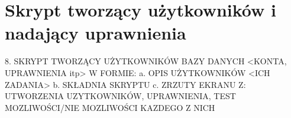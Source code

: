 \section{Skrypt tworzący użytkowników i nadający uprawnienia}


8. SKRYPT TWORZĄCY UŻYTKOWNIKÓW BAZY DANYCH <KONTA, UPRAWNIENIA itp>
W FORMIE:
a. OPIS UŻYTKOWNIKÓW <ICH ZADANIA>
b. SKŁADNIA SKRYPTU
c. ZRZUTY EKRANU Z: UTWORZENIA UZYTKOWNIKÓW, UPRAWNIENIA, TEST
MOZLIWOŚCI/NIE MOZLIWOŚCI KAZDEGO Z NICH